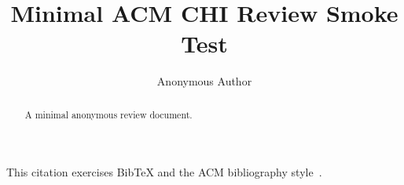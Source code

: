 \documentclass[manuscript,review,anonymous]{acmart}
\title{Minimal ACM CHI Review Smoke Test}
\author{Anonymous Author}
\begin{document}
\begin{abstract}
  A minimal anonymous review document.
\end{abstract}

\maketitle

\makeatletter
\if@twocolumn
\PackageError{acm-smoke}{Review layout must be one column}{}%
\fi
\makeatother

This citation exercises BibTeX and the ACM bibliography style~\cite{chi}.



\end{document}
